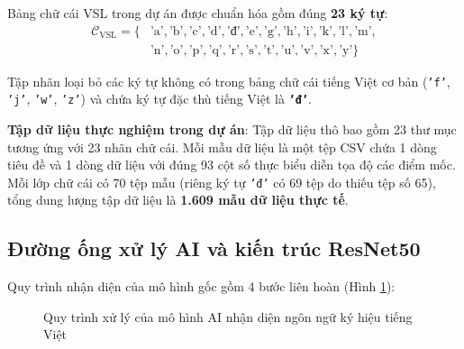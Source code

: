 Bảng chữ cái VSL trong dự án được chuẩn hóa gồm đúng \textbf{23 ký tự}:
\begin{equation}
\label{eq:vsl_alphabet}
\begin{aligned}
\mathcal{C}_{\text{VSL}} = \{ & \text{'a'}, \text{'b'}, \text{'c'}, \text{'d'}, \text{'đ'}, \text{'e'}, \text{'g'}, \text{'h'}, \text{'i'}, \text{'k'}, \text{'l'}, \text{'m'}, \\
& \text{'n'}, \text{'o'}, \text{'p'}, \text{'q'}, \text{'r'}, \text{'s'}, \text{'t'}, \text{'u'}, \text{'v'}, \text{'x'}, \text{'y'} \}
\end{aligned}
\end{equation}

Tập nhãn loại bỏ các ký tự không có trong bảng chữ cái tiếng Việt cơ bản (\texttt{'f'}, \texttt{'j'}, \texttt{'w'}, \texttt{'z'}) và chứa ký tự đặc thù tiếng Việt là \textbf{\texttt{'đ'}}.

\textbf{Tập dữ liệu thực nghiệm trong dự án}: Tập dữ liệu thô bao gồm 23 thư mục tương ứng với 23 nhãn chữ cái. Mỗi mẫu dữ liệu là một tệp CSV chứa 1 dòng tiêu đề và 1 dòng dữ liệu với đúng 93 cột số thực biểu diễn tọa độ các điểm mốc. Mỗi lớp chữ cái có 70 tệp mẫu (riêng ký tự \texttt{'đ'} có 69 tệp do thiếu tệp số 65), tổng dung lượng tập dữ liệu là \textbf{1.609 mẫu dữ liệu thực tế}.

\subsection{Đường ống xử lý AI và kiến trúc ResNet50}
\label{subsec:pipeline_ai_goc}

Quy trình nhận diện của mô hình gốc gồm 4 bước liên hoàn (Hình \ref{fig:pipeline_ai_goc}):

\begin{figure}[htbp]
\centering
{}
\caption{Quy trình xử lý của mô hình AI nhận diện ngôn ngữ ký hiệu tiếng Việt}
\label{fig:pipeline_ai_goc}
\end{figure}

